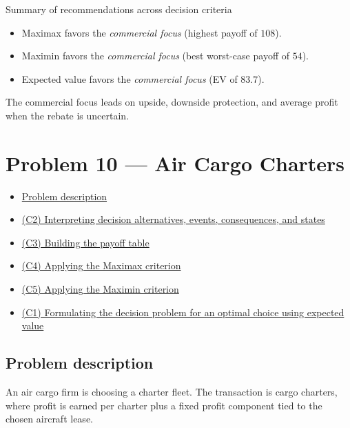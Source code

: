 \documentclass[11pt]{article}
\begin{document}
	Summary of recommendations across decision criteria
	\begin{itemize}
		\item Maximax favors the \emph{commercial focus} (highest payoff of $108$).
		\item Maximin favors the \emph{commercial focus} (best worst-case payoff of $54$).
		\item Expected value favors the \emph{commercial focus} (EV of $83.7$).
	\end{itemize}
	
	The commercial focus leads on upside, downside protection, and average profit when the rebate is uncertain.
	
	\section*{Problem 10 — Air Cargo Charters}
	
	\hypertarget{problem10}{}
	
	\hypertarget{problem10-criteria}{}

	
	\begin{itemize}
		\item \hyperlink{problem10-problem}{Problem description}
		\item \hyperlink{problem10-c2}{(C2) Interpreting decision alternatives, events, consequences, and states}
		\item \hyperlink{problem10-c3}{(C3) Building the payoff table}
		\item \hyperlink{problem10-c4}{(C4) Applying the Maximax criterion}
		\item \hyperlink{problem10-c5}{(C5) Applying the Maximin criterion}
		\item \hyperlink{problem10-c1}{(C1) Formulating the decision problem for an optimal choice using expected value}
	\end{itemize}
	
	
	\subsection*{Problem description}
	
	\hypertarget{problem10-problem}{}
	
	An air cargo firm is choosing a charter fleet. The transaction is cargo charters, where profit is earned per charter
	plus a fixed profit component tied to the chosen aircraft lease.
	
	
	
	
	
\end{document}
